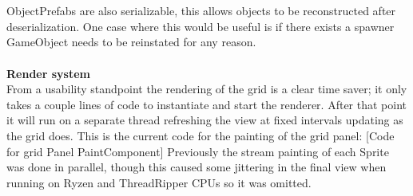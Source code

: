 \documentclass[main.tex]{subfiles}
\begin{document}
\\ \\
ObjectPrefabs are also serializable, this allows objects to be reconstructed after deserialization. One case where this would be useful is if there exists a spawner GameObject needs to be reinstated for any reason. 
\\ \\
\textbf{Render system} \\%
From a usability standpoint the rendering of the grid is a clear time saver; it only takes a couple lines of code to instantiate and start the renderer. After that point it will run on a separate thread refreshing the view at fixed intervals updating as the grid does. This is the current code for the painting of the grid panel:
	[Code for grid Panel PaintComponent]
Previously the stream painting of each Sprite was done in parallel, though this caused some jittering in the final view when running on Ryzen and ThreadRipper CPUs so it was omitted.
\end{document}
